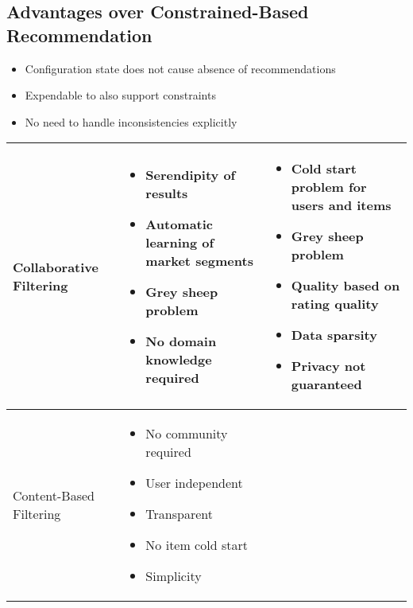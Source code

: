 \documentclass{article}
\begin{document}
\subsection{Advantages over Constrained-Based Recommendation}

\begin{itemize}
    \item Configuration state does not cause absence of recommendations
    \item Expendable to also support constraints 
    \item No need to handle inconsistencies explicitly
\end{itemize}

\begin{table}
    \begin{center}
        \begin{tabularx}{\columnwidth}{X|X|X}
            \hline
            Collaborative Filtering 
            &   \begin{itemize}
                    \item Serendipity of results 
                    \item Automatic learning of market segments
                    \item Grey sheep problem
                    \item No domain knowledge required
                \end{itemize}
            &   \begin{itemize}
                    \item Cold start problem for users and items
                    \item Grey sheep problem
                    \item Quality based on rating quality
                    \item Data sparsity
                    \item Privacy not guaranteed
                \end{itemize} \\
            \hline
            Content-Based Filtering 
            &   \begin{itemize}
                    \item No community required 
                    \item User independent
                    \item Transparent
                    \item No item cold start
                    \item Simplicity

\end{itemize}
\end{tabularx}
\end{center}
\end{table}
\end{document}
